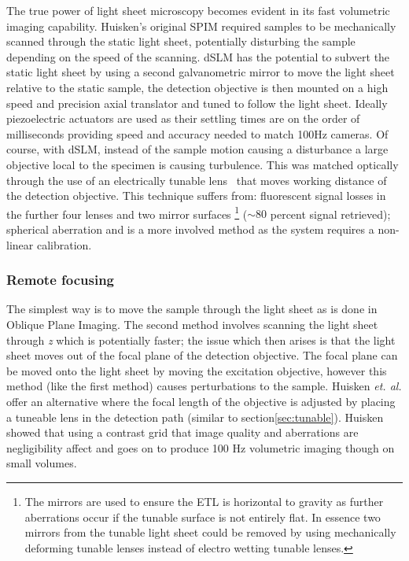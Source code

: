 The true power of light sheet microscopy becomes evident in its fast volumetric imaging capability.
Huisken's original SPIM required samples to be mechanically scanned through the static light sheet, potentially disturbing the sample depending on the speed of the scanning.
dSLM has the potential to subvert the static light sheet by using a second galvanometric mirror to move the light sheet relative to the static sample, the detection objective is then mounted on a high speed and precision axial translator and tuned to follow the light sheet.
Ideally piezoelectric actuators are used as their settling times are on the order of milliseconds providing speed and accuracy needed to match 100Hz cameras.
Of course, with dSLM, instead of the sample motion causing a disturbance a large objective local to the specimen is causing turbulence.
This was matched optically through the use of an electrically tunable lens~\cite{fahrbach_rapid_2013-1} that moves working distance of the detection objective.
This technique suffers from: fluorescent signal losses in the further four lenses and two mirror surfaces
\footnote{The mirrors are used to ensure the ETL is horizontal to gravity as further aberrations occur if the tunable surface is not entirely flat.
In essence two mirrors from the tunable light sheet could be removed by using mechanically deforming tunable lenses instead of electro wetting tunable lenses.}
($\sim 80$ percent signal retrieved); spherical aberration and is a more involved method as the system requires a non-linear calibration.

\subsubsection{Remote focusing} %

The simplest way is to move the sample through the light sheet as is done in Oblique Plane Imaging.
The second method involves scanning the light sheet through \textit{z} which is potentially faster; the issue which then arises is that the light sheet moves out of the focal plane of the detection objective.
The focal plane can be moved onto the light sheet by moving the excitation objective, however this method (like the first method) causes perturbations to the sample.
Huisken \emph{et. al.} offer an alternative where the focal length of the objective is adjusted by placing a tuneable lens in the detection path (similar to section\ref{sec:tunable})\cite{Fahrbach2013}.
Huisken showed that using a contrast grid that image quality and aberrations are negligibility affect and goes on to produce 100 Hz volumetric imaging though on small volumes\cite{Fahrbach2013}.

